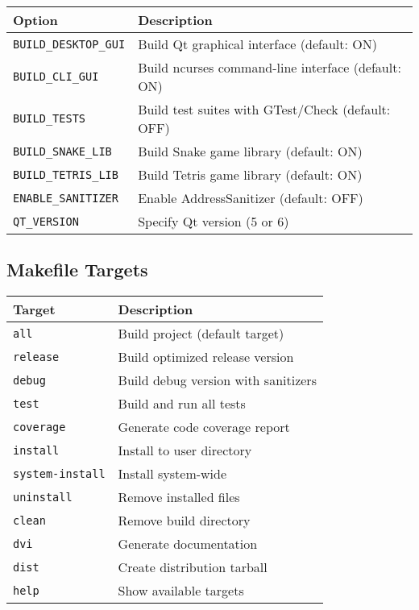 \documentclass[12pt]{article}
\begin{document}
\begin{tabularx}{\textwidth}{|l|X|}
\hline
\textbf{Option} & \textbf{Description} \\
\hline
\texttt{BUILD\_DESKTOP\_GUI} & Build Qt graphical interface (default: ON) \\
\hline
\texttt{BUILD\_CLI\_GUI} & Build ncurses command-line interface (default: ON) \\
\hline
\texttt{BUILD\_TESTS} & Build test suites with GTest/Check (default: OFF) \\
\hline
\texttt{BUILD\_SNAKE\_LIB} & Build Snake game library (default: ON) \\
\hline
\texttt{BUILD\_TETRIS\_LIB} & Build Tetris game library (default: ON) \\
\hline
\texttt{ENABLE\_SANITIZER} & Enable AddressSanitizer (default: OFF) \\
\hline
\texttt{QT\_VERSION} & Specify Qt version (5 or 6) \\
\hline
\end{tabularx}

\subsection{Makefile Targets}

\begin{tabularx}{\textwidth}{|l|X|}
\hline
\textbf{Target} & \textbf{Description} \\
\hline
\texttt{all} & Build project (default target) \\
\hline
\texttt{release} & Build optimized release version \\
\hline
\texttt{debug} & Build debug version with sanitizers \\
\hline
\texttt{test} & Build and run all tests \\
\hline
\texttt{coverage} & Generate code coverage report \\
\hline
\texttt{install} & Install to user directory \\
\hline
\texttt{system-install} & Install system-wide \\
\hline
\texttt{uninstall} & Remove installed files \\
\hline
\texttt{clean} & Remove build directory \\
\hline
\texttt{dvi} & Generate documentation \\
\hline
\texttt{dist} & Create distribution tarball \\
\hline
\texttt{help} & Show available targets \\
\hline
\end{tabularx}
\end{document}
